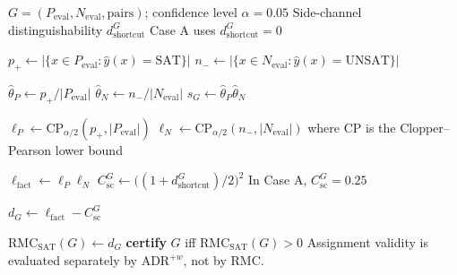 \documentclass[conference]{IEEEtran}
\theoremstyle{remark}
\newcommand{\RMCSAT}{\mathrm{RMC}_{\mathrm{SAT}}}
\newcommand{\thetaP}{\hat{\theta}_P}
\newcommand{\thetaN}{\hat{\theta}_N}
\newcommand{\shat}{\hat{s}_G}
\newcommand{\shortcutDisc}{d_{\mathrm{shortcut}}^{G}}
\newcommand{\shortcutCeiling}{C_{\mathrm{sc}}^{G}}
\newcommand{\pp}{p_{+}}
\newcommand{\nm}{n_{-}}
\begin{document}
\begin{algorithm}[t]
\small
\caption{$\RMCSAT$ Computation for Group $G$}
\label{alg:rmc}
\begin{algorithmic}[1]
\Require $G=(P_{\mathrm{eval}},N_{\mathrm{eval}},\text{pairs})$; 
         confidence level $\alpha=0.05$
\Require Side-channel distinguishability $\shortcutDisc$
         \Statex \hspace{\algorithmicindent} Case A uses $\shortcutDisc=0$

\State $\pp \gets |\{x\in P_{\mathrm{eval}}:\hat{y}(x)=\mathrm{SAT}\}|$
\State $\nm \gets |\{x\in N_{\mathrm{eval}}:\hat{y}(x)=\mathrm{UNSAT}\}|$

\State $\thetaP \gets \pp/|P_{\mathrm{eval}}|$
\State $\thetaN \gets \nm/|N_{\mathrm{eval}}|$
\State $\shat \gets \thetaP\thetaN$

\State $\ell_P \gets \mathrm{CP}_{\alpha/2}(\pp,|P_{\mathrm{eval}}|)$
\State $\ell_N \gets \mathrm{CP}_{\alpha/2}(\nm,|N_{\mathrm{eval}}|)$
\Statex \hspace{\algorithmicindent} where CP is the Clopper--Pearson lower bound

\State $\ell_{\mathrm{fact}} \gets \ell_P\ell_N$
\State $\shortcutCeiling \gets \bigl((1+\shortcutDisc)/2\bigr)^2$
\Statex \hspace{\algorithmicindent} In Case A, $\shortcutCeiling=0.25$

\State $d_G \gets \ell_{\mathrm{fact}}-\shortcutCeiling$

\State $\RMCSAT(G) \gets d_G$
\State \textbf{certify} $G$ iff $\RMCSAT(G)>0$
\Statex \hspace{\algorithmicindent} Assignment validity is evaluated separately by ADR$^{+w}$, not by RMC.
\end{algorithmic}
\end{algorithm}
\end{document}
